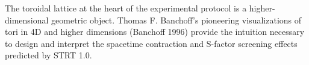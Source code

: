 
The toroidal lattice at the heart of the experimental protocol is a higher-dimensional geometric object. Thomas F. Banchoff's pioneering visualizations of tori in 4D and higher dimensions (Banchoff 1996) provide the intuition necessary to design and interpret the spacetime contraction and S-factor screening effects predicted by STRT 1.0.

